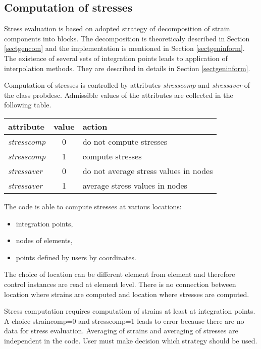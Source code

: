 \subsection{Computation of stresses}
\label{sectstresscomp}

Stress evaluation is based on adopted strategy of decomposition of strain components
into blocks. The decomposition is theoreticaly described in Section \ref{sectgencom} and the
implementation is mentioned in Section \ref{sectgeninform}. The existence of several sets of
integration points leads to application of interpolation methods. They are described in details
in Section \ref{sectgeninform}.

Computation of stresses is controlled by attributes {\it stresscomp} and {\it stressaver} of the class
{\sf probdesc}. Admissible values of the attributes are collected in the following table.

\begin{tabular}{|l|c|l|}
\hline
attribute & value & action
\\ \hline \hline
{\it stresscomp} & 0 & do not compute stresses
\\ \hline
{\it stresscomp} & 1 & compute stresses
\\ \hline \hline
{\it stressaver} & 0 & do not average stress values in nodes
\\ \hline
{\it stressaver} & 1 & average stress values in nodes
\\ \hline
\end{tabular}

The code is able to compute stresses at various locations:
\begin{itemize}
\item{integration points,}
\item{nodes of elements,}
\item{points defined by users by coordinates.}
\end{itemize}
The choice of location can be different element from element and therefore control instances are read
at element level. There is no connection between location where strains are computed and
location where stresses are computed.

Stress computation requires computation of strains at least at integration points.
A choice straincomp=0 and stresscomp=1 leads
to error because there are no data for stress evaluation. Averaging of strains and averaging of stresses
are independent in the code. User must make decision which strategy should be used.

